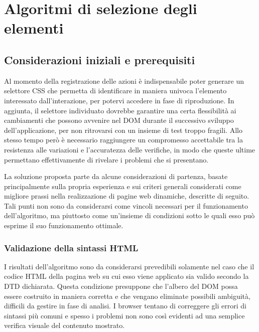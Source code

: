 \documentclass[12pt]{toptesi}
\begin{document}
\author{Fabio Sussetto}

\frontespizio

\indici









\chapter{Algoritmi di selezione degli elementi}

\section{Considerazioni iniziali e prerequisiti}

Al momento della registrazione delle azioni è indispensabile poter generare un selettore CSS che permetta di identificare in maniera univoca l'elemento interessato dall'interazione, per potervi accedere in fase di riproduzione. In aggiunta, il selettore individuato dovrebbe garantire una certa flessibilità ai cambiamenti che possono avvenire nel DOM durante il successivo sviluppo dell'applicazione, per non ritrovarsi con un insieme di test troppo fragili.
Allo stesso tempo però è necessario raggiungere un compromesso accettabile tra la resistenza alle variazioni e l'accuratezza delle verifiche, in modo che queste ultime permettano effettivamente di rivelare i problemi che si presentano.

La soluzione proposta parte da alcune considerazioni di partenza, basate principalmente sulla propria esperienza e sui criteri generali considerati come migliore prassi nella realizzazione di pagine web dinamiche, descritte di seguito. Tali punti non sono da considerarsi come vincoli necessari per il funzionamento dell'algoritmo, ma piuttosto come un'insieme di condizioni sotto le quali esso può esprime il suo funzionamento ottimale. 

\subsection {Validazione della sintassi HTML}

I risultati dell'algoritmo sono da considerarsi prevedibili solamente nel caso che il codice HTML della pagina web su cui esso viene applicato sia valido secondo la DTD dichiarata. Questa condizione presuppone che l'albero del DOM possa essere costruito in maniera corretta e che vengano eliminate possibili ambiguità, difficili da gestire in fase di analisi. I browser tentano di correggere gli errori di sintassi più comuni e spesso i problemi non sono così evidenti ad una semplice verifica visuale del contenuto mostrato. 
\end{document}
